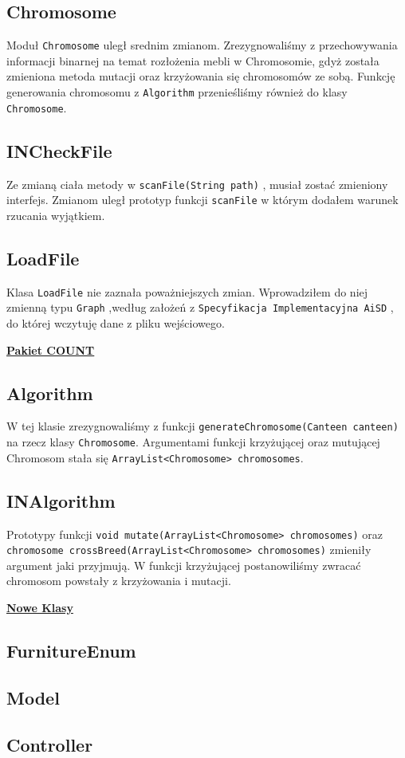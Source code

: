 \documentclass{article}
\begin{document}
\subsection{Chromosome}
\indent Moduł \verb|Chromosome| uległ srednim zmianom.
Zrezygnowaliśmy z przechowywania informacji binarnej na temat rozłożenia mebli w Chromosomie, gdyż została zmieniona metoda mutacji oraz krzyżowania się chromosomów ze sobą. Funkcję generowania chromosomu z \verb|Algorithm| przenieśliśmy również do klasy \verb|Chromosome|.
\subsection{INCheckFile}
\indent Ze zmianą ciała metody w \verb|scanFile(String path)| , musiał zostać zmieniony interfejs. Zmianom uległ prototyp funkcji \verb|scanFile| w którym dodałem warunek rzucania wyjątkiem.
\subsection{LoadFile}
\indent Klasa \verb|LoadFile| nie zaznała poważniejszych zmian. Wprowadziłem do niej zmienną  typu \verb|Graph| ,według założeń z \verb|Specyfikacja Implementacyjna AiSD| , do której wczytuję dane z pliku wejściowego.
\begin{center}
\vspace{3mm}
\underline{\huge\textbf{{Pakiet COUNT}}}
\end{center}
\subsection{Algorithm}
\indent W tej klasie zrezygnowaliśmy z funkcji \verb|generateChromosome(Canteen canteen)| na rzecz klasy \verb|Chromosome|. Argumentami funkcji krzyżującej oraz mutującej Chromosom stała się \verb|ArrayList<Chromosome> chromosomes|.
\subsection{INAlgorithm}
\indent Prototypy funkcji \verb|void mutate(ArrayList<Chromosome> chromosomes)| oraz \verb|chromosome crossBreed(ArrayList<Chromosome> chromosomes)| zmieniły argument jaki przyjmują. W funkcji krzyżującej postanowiliśmy zwracać chromosom powstały z krzyżowania i mutacji.
\begin{center}
\vspace{3mm}
\underline{\huge\textbf{{Nowe Klasy}}}
\subsection{FurnitureEnum}
\subsection{Model}
\subsection{Controller}
\end{center}
\newpage
\end{document}
